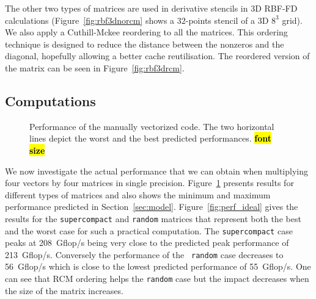 \documentclass[10pt,conference,compsocconf]{IEEEtran}
\newcommand{\todo}[1]{{\color{red}\textbf{\hl{#1}}\xspace}}
\begin{document}
The other two types of matrices are used in derivative stencils in 3D
RBF-FD calculations (Figure~\ref{fig:rbf3dnorcm} shows a $32$-points
stencil of a 3D $8^3$ grid). We also apply a Cuthill-Mckee reordering to
all the matrices.  This ordering technique is designed to reduce the
distance between the nonzeros and the diagonal, hopefully allowing a
better cache reutilisation. The reordered version of the matrix can be
seen in Figure~\ref{fig:rbf3drcm}.


\subsection{Computations}

\begin{figure}[t]
  \centering
  
  \caption{Performance of the manually vectorized code. The two
    horizontal lines depict the worst and the best predicted performances. \todo{font size}}
  \label{fig:expe_types}
\end{figure}

We now investigate the actual performance that we can obtain when
multiplying four vectors by four matrices in single
precision. Figure~\ref{fig:expe_types} presents results for different
types of matrices and also shows the minimum and maximum performance
predicted in Section~\ref{sec:model}. Figure~\ref{fig:perf_ideal}
gives the results for the {\tt supercompact} and {\tt random} matrices
that represent both the best and the worst case for such a practical 
computation. The {\tt supercompact} case peaks at
208~Gflop/s being very close to the predicted peak
performance of 213~Gflop/s. Conversely the performance of the {\tt
  random} case decreases to 56~Gflop/s which is close to
the lowest predicted performance of 55~Gflop/s. One can see that RCM
ordering helps the {\tt random} case but the impact decreases when the
size of the matrix increases.
\end{document}
